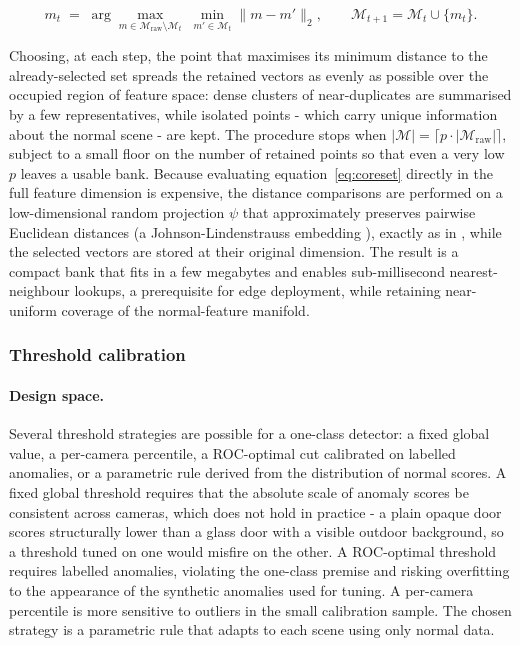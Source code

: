 \begin{equation}
  m_{t} \;=\; \arg\max_{m \in \mathcal{M}_{\mathrm{raw}} \setminus \mathcal{M}_t}
  \; \min_{m' \in \mathcal{M}_t} \lVert m - m' \rVert_2 ,
  \qquad
  \mathcal{M}_{t+1} = \mathcal{M}_t \cup \{m_t\} .
  \label{eq:coreset}
\end{equation}

Choosing, at each step, the point that maximises its minimum distance to the
already-selected set spreads the retained vectors as evenly as possible over the
occupied region of feature space: dense clusters of near-duplicates are summarised
by a few representatives, while isolated points - which carry unique information
about the normal scene - are kept. The procedure stops when
$|\mathcal{M}| = \lceil p \cdot |\mathcal{M}_{\mathrm{raw}}| \rceil$, subject to a
small floor on the number of retained points so that even a very low $p$ leaves a
usable bank. Because evaluating equation~\eqref{eq:coreset} directly in the full
feature dimension is expensive, the distance comparisons are performed on a
low-dimensional random projection $\psi$ that approximately preserves pairwise
Euclidean distances (a Johnson-Lindenstrauss embedding \cite{enwiki:1357719950}), exactly as in
\cite{Roth2022}, while the selected vectors are stored at their original
dimension. The result is a compact bank that
fits in a few megabytes and enables sub-millisecond nearest-neighbour lookups, a
prerequisite for edge deployment, while retaining near-uniform coverage of the
normal-feature manifold.

\subsubsection{Threshold calibration}

\paragraph{Design space.} Several threshold strategies are possible for a
one-class detector: a fixed global value, a per-camera percentile, a
ROC-optimal cut calibrated on labelled anomalies, or a parametric rule derived
from the distribution of normal scores. A fixed global threshold requires that
the absolute scale of anomaly scores be consistent across cameras, which does
not hold in practice - a plain opaque door scores structurally lower than a glass
door with a visible outdoor background, so a threshold tuned on one would
misfire on the other. A ROC-optimal threshold requires labelled anomalies,
violating the one-class premise and risking overfitting to the appearance of the
synthetic anomalies used for tuning. A per-camera percentile is more sensitive to
outliers in the small calibration sample. The chosen strategy is a parametric
rule that adapts to each scene using only normal data.

